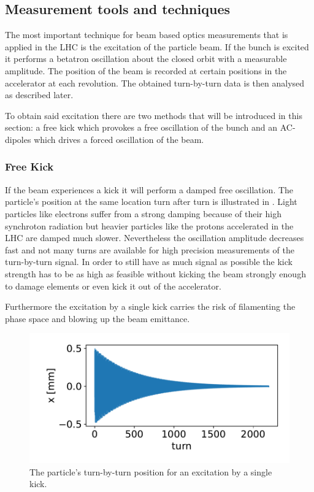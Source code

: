 \subsection{Measurement tools and techniques}

The most important technique for beam based optics measurements that is applied in the LHC is the excitation
of the particle beam.
If the bunch is excited it performs a betatron oscillation about the closed orbit with a measurable amplitude.
The position of the beam is recorded at certain positions in the accelerator at each revolution. The
obtained turn-by-turn data is then analysed as described later.

To obtain said excitation there are two methods that will be introduced in this section: a free kick
which provokes a free oscillation of the bunch and an AC-dipoles which drives a forced oscillation of
the beam. 

\subsubsection{Free Kick}

If the beam experiences a kick it will perform a damped free oscillation.
The particle's position at the same location turn after turn is illustrated in .
Light particles like electrons
suffer from a strong damping because of their high synchroton radiation but heavier particles like the
protons accelerated in the LHC are damped much slower.
Nevertheless the oscillation amplitude decreases fast and not many turns are available for high
precision measurements of the turn-by-turn signal. In order to still have as much signal as possible
the kick strength has to be as high as feasible without kicking the beam strongly enough to damage elements or even kick it out of the accelerator.

Furthermore the excitation by a single kick carries the risk of filamenting the
phase space and blowing up the beam emittance.
%
\begin{figure}[h]
    \centering
    \includegraphics[width=.8\linewidth]{kick_plot.pdf}  
    \caption{The particle's turn-by-turn position for an excitation by a single kick.}
    \label{fig_kick_plot}
\end{figure}
%
